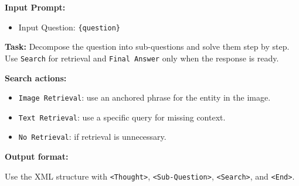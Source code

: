 \documentclass{article} %
\begin{document}
\begin{tcolorbox}[
  title=Example: System VLM Prompt,
  coltitle=black,
  colbacktitle=blue!8,
  colback=blue!5,
  colframe=black,
  fonttitle=\bfseries,
  arc=2mm,
  boxrule=0.5pt,
  enhanced jigsaw,
  breakable,
  width=\linewidth,
  left=6pt,
  right=6pt,
  top=6pt,
  bottom=6pt
]

\textbf{Input Prompt:}

\begin{itemize}
  \item Input Question: \texttt{\{question\}}
\end{itemize}

\textbf{Task:}
Decompose the question into sub-questions and solve them step by step.
Use \texttt{Search} for retrieval and \texttt{Final Answer} only when the response is ready.

\textbf{Search actions:}
\begin{itemize}
  \item \texttt{Image Retrieval}: use an anchored phrase for the entity in the image.
  \item \texttt{Text Retrieval}: use a specific query for missing context.
  \item \texttt{No Retrieval}: if retrieval is unnecessary.
\end{itemize}

\textbf{Output format:}

Use the XML structure with \texttt{<Thought>}, \texttt{<Sub-Question>}, \texttt{<Search>}, and \texttt{<End>}.
\end{tcolorbox}
\end{document}
